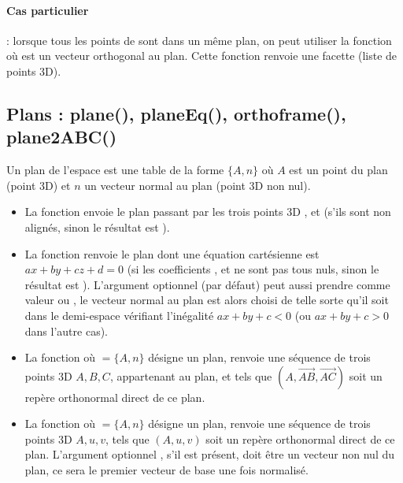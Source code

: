 \paragraph{Cas particulier}: lorsque tous les points de  sont dans un même plan, on peut utiliser la fonction  où  est un vecteur orthogonal au plan. Cette fonction renvoie une facette (liste de points 3D).

\subsection{Plans : plane(), planeEq(), orthoframe(), plane2ABC()}

Un plan de l'espace est une table de la forme $\{A,n\}$ où $A$ est un point du plan (point 3D) et $n$ un vecteur normal au plan (point 3D non nul).
\begin{itemize}
    \item La fonction  envoie le plan passant par les trois points 3D ,  et  (s'ils sont non alignés, sinon le résultat est \nil).
    
    \item La fonction  renvoie le plan dont une équation cartésienne est $ax+by+cz+d=0$ (si les coefficients ,  et  ne sont pas tous nuls, sinon le résultat est \nil). L'argument optionnel  (\nil par défaut) peut aussi prendre comme valeur  ou , le vecteur normal au plan est alors choisi de telle sorte qu'il soit dans le demi-espace vérifiant l'inégalité $ax+by+c<0$ (ou $ax+by+c>0$ dans l'autre cas).
    
    \item La fonction  où $=\{A,n\}$ désigne un plan, renvoie une séquence de trois points 3D $A,B,C$, appartenant au plan, et tels que $(A,\vec{AB},\vec{AC})$ soit un repère orthonormal direct de ce plan.
    
    \item La fonction  où $=\{A,n\}$ désigne un plan, renvoie une séquence de trois points 3D $A,u,v$, tels que $(A,u,v)$ soit un repère orthonormal direct de ce plan. L'argument optionnel , s'il est présent, doit être un vecteur non nul du plan, ce sera le premier vecteur de base une fois normalisé.
\end{itemize}

